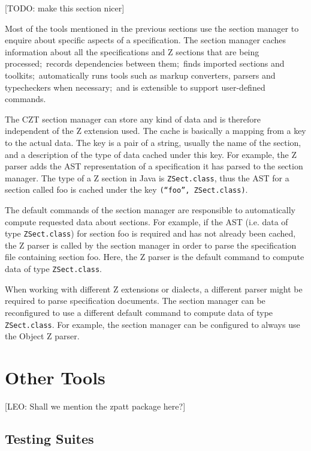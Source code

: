 \documentclass{llncs}
\newcommand{\Interface}[1]{\texttt{#1}}
\begin{document}
  [TODO: make this section nicer]

  Most of the tools mentioned in the previous sections use the section
  manager to enquire about specific aspects of a specification.  The
  section manager caches information about all the specifications and
  Z sections that are being processed;~records dependencies between
  them;~finds imported sections and toolkits;~automatically runs tools
  such as markup converters, parsers and typecheckers when necessary;~and
  is extensible to support user-defined commands.

  The CZT section manager can store any kind of data and is therefore
  independent of the Z extension used.  The cache is basically a mapping
  from a key to the actual data.  The key is a pair of a string,
  usually the name of the section, and a description of the type of
  data cached under this key.  For example, the Z parser adds the AST
  representation of a specification it has parsed to the section
  manager.  The type of a Z section in Java is
  \Interface{ZSect.class}, thus the AST for a section called foo is
  cached under the key \texttt{(``foo'',~ZSect.class)}.

  The default commands of the section manager are responsible to
  automatically compute requested data about sections. For example, if
  the AST (i.e. data of type \Interface{ZSect.class}) for section foo
  is required and has not already been cached, the Z parser is called
  by the section manager in order to parse the specification file
  containing section foo.  Here, the Z parser is the default command
  to compute data of type \Interface{ZSect.class}.

  When working with different Z extensions or dialects, a different
  parser might be required to parse specification documents.  The
  section manager can be reconfigured to use a different default
  command to compute data of type \Interface{ZSect.class}.  For
  example, the section manager can be configured to always use the
  Object Z parser.

\section{Other Tools}
\label{other-tools}

[LEO: Shall we mention the zpatt package here?]

\subsection{Testing Suites}
\end{document}
